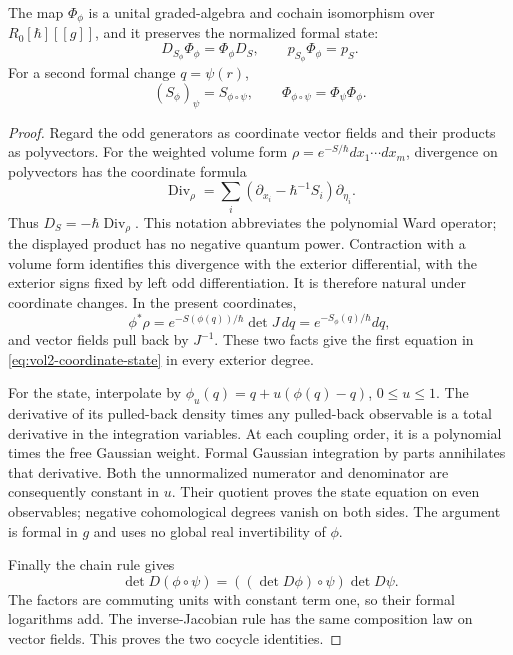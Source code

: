 \begin{theorem}\label{thm:vol2-ward-coordinate-descent}
The map $\Phi_\phi$ is a unital graded-algebra and cochain
isomorphism over $R_0[\hbar][[g]]$, and it preserves the
normalized formal state:
\begin{equation}\label{eq:vol2-coordinate-state}
 D_{S_\phi}\Phi_\phi=\Phi_\phi D_S,
 \qquad p_{S_\phi}\Phi_\phi=p_S.
\end{equation}
For a second formal change $q=\psi(r)$,
\[
 (S_\phi)_\psi=S_{\phi\circ\psi},\qquad
 \Phi_{\phi\circ\psi}=\Phi_\psi\Phi_\phi.
\]
\end{theorem}
\begin{proof}
Regard the odd generators as coordinate vector fields and
their products as polyvectors. For the weighted volume form
$\rho=e^{-S/\hbar}dx_1\cdots dx_m$, divergence on polyvectors
has the coordinate formula
\[
 \operatorname{Div}_\rho
    =\sum_i\left(\partial_{x_i}-\hbar^{-1}S_i\right)
                                                    \partial_{\eta_i}.
\]
Thus $D_S=-\hbar\operatorname{Div}_\rho$.
This notation abbreviates the polynomial Ward operator; the
displayed product has no negative quantum power.
Contraction with a volume form identifies this divergence
with the exterior differential, with the exterior signs fixed
by left odd differentiation. It is therefore natural under
coordinate changes. In the present coordinates,
\[
 \phi^*\rho=e^{-S(\phi(q))/\hbar}\det J\,dq
                 =e^{-S_\phi(q)/\hbar}dq,
\]
and vector fields pull back by $J^{-1}$. These two facts
give the first equation in \eqref{eq:vol2-coordinate-state}
in every exterior degree.

For the state, interpolate by
$\phi_u(q)=q+u(\phi(q)-q)$, $0\leq u\leq1$.
The derivative of its pulled-back density times any pulled-back
observable is a total derivative in the integration variables.
At each coupling order, it is a polynomial times the free
Gaussian weight. Formal Gaussian integration by parts
annihilates that derivative. Both the unnormalized numerator
and denominator are consequently constant in $u$.
Their quotient proves the state equation on even observables;
negative cohomological degrees vanish on both sides.
The argument is formal in $g$ and uses no global real
invertibility of $\phi$.

Finally the chain rule gives
\[
 \det D(\phi\circ\psi)
       =((\det D\phi)\circ\psi)\det D\psi.
\]
The factors are commuting units with constant term one,
so their formal logarithms add. The inverse-Jacobian rule
has the same composition law on vector fields. This proves
the two cocycle identities.
\end{proof}

